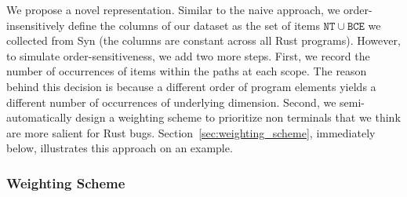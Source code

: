 We propose a novel representation. Similar to the naive approach, we order-insensitively define the columns of our dataset as the set of items $\mathtt{NT} \cup \mathtt{BCE}$ we collected from Syn (the columns are constant across all Rust programs). However, to simulate order-sensitiveness, we add two more steps. First, we record the number of occurrences of items within the paths at each scope. The reason behind this decision is because a different order of program elements yields a different number of occurrences of underlying dimension. Second, we semi-automatically design a weighting scheme to prioritize non terminals that we think are more salient for Rust bugs. Section~\ref{sec:weighting_scheme}, immediately below, illustrates this approach on an example.

\subsubsection{\label{sec:weighting_scheme}Weighting Scheme}

